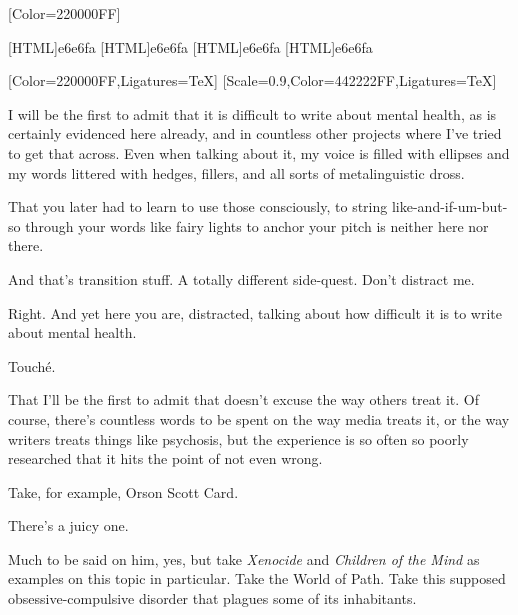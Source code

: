 \label{movement}
\renewfontfamily{}[Color=220000FF]

[HTML]{e6e6fa}
[HTML]{e6e6fa}
[HTML]{e6e6fa}
[HTML]{e6e6fa}
\begin{paracol}{2}
\begin{leftcolumn}

[Color=220000FF,Ligatures=TeX]
\renewfontfamily{}[Scale=0.9,Color=442222FF,Ligatures=TeX]

\noindent I will be the first to admit that it is difficult to write about mental health, as is certainly evidenced here already, and in countless other projects where I've tried to get that across. Even when talking about it, my voice is filled with ellipses and my words littered with hedges, fillers, and all sorts of metalinguistic dross.

\begin{ally}
That you later had to learn to use those consciously, to string like-and-if-um-but-so through your words like fairy lights to anchor your pitch is neither here nor there.
\end{ally}
And that's transition stuff. A totally different side-quest. Don't distract me.

\begin{ally}
Right. And yet here you are, distracted, talking about how difficult it is to write about mental health.
\end{ally}
Touché.

That I'll be the first to admit that doesn't excuse the way others treat it. Of course, there's countless words to be spent on the way media treats it, or the way writers treats things like psychosis, but the experience is so often so poorly researched that it hits the point of not even wrong.

Take, for example, Orson Scott Card.

\begin{ally}
There's a juicy one.
\end{ally}
Much to be said on him, yes, but take \emph{Xenocide} and \emph{Children of the Mind} as examples on this topic in particular. Take the World of Path. Take this supposed obsessive-compulsive disorder that plagues some of its inhabitants.
\newpage


\end{leftcolumn}
\end{paracol}
